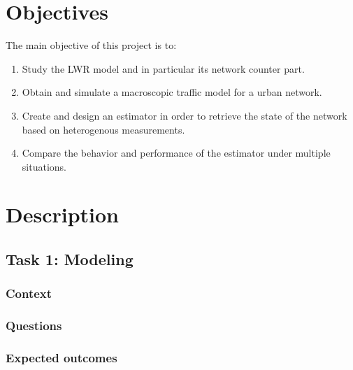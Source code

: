 \documentclass[]{book}
\providecommand{\tightlist}{%
  \setlength{\itemsep}{0pt}\setlength{\parskip}{0pt}}
\theoremstyle{definition}
\theoremstyle{definition}
\theoremstyle{definition}
\theoremstyle{remark}
\begin{document}
\hypertarget{objectives-2}{%
\section*{Objectives}\label{objectives-2}}

The main objective of this project is to:

\begin{enumerate}
\def\labelenumi{\arabic{enumi}.}
\tightlist
\item
  Study the LWR model and in particular its network counter part.
\item
  Obtain and simulate a macroscopic traffic model for a urban network.
\item
  Create and design an estimator in order to retrieve the state of the
  network based on heterogenous measurements.
\item
  Compare the behavior and performance of the estimator under multiple
  situations.
\end{enumerate}

\hypertarget{description-2}{%
\section*{Description}\label{description-2}}

\hypertarget{task-1-modeling-1}{%
\subsection*{Task 1: Modeling}\label{task-1-modeling-1}}

\hypertarget{context-9}{%
\subsubsection*{Context}\label{context-9}}

\hypertarget{questions-8}{%
\subsubsection*{Questions}\label{questions-8}}

\hypertarget{expected-outcomes-8}{%
\subsubsection*{Expected outcomes}\label{expected-outcomes-8}}
\end{document}
